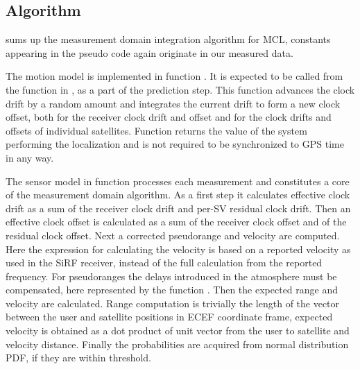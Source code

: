 \subsection{Algorithm}
 sums up the measurement domain integration
algorithm for MCL, constants appearing in the pseudo code again originate in our
measured data.

The motion model is implemented in function \predictGPS{}.
It is expected to be called from the function \sampleFromActionModel{} in ,
as a part of the prediction step.
This function advances the clock drift by a random amount
and integrates the current drift to form a new clock offset,
both for the receiver clock drift and offset and for the
clock drifts and offsets of individual satellites.
Function \timeFunc{} returns the value of the system performing the localization
and is not required to be synchronized to GPS time in any way.

The sensor model in function \observationProbabilityGPS{} processes each measurement
and constitutes a core of the measurement domain algorithm.
As a first step it calculates effective clock drift as a sum of the receiver
clock drift and per-SV residual clock drift.
Then an effective clock offset is calculated as a sum of the receiver clock offset
and of the residual clock offset.
Next a corrected pseudorange and velocity are computed.
Here the expression for calculating the velocity is based on a reported velocity
as used in the SiRF receiver, instead of the full calculation from the reported frequency.
For pseudoranges the delays introduced in the atmosphere must be compensated,
here represented by the function \delays{}.
Then the expected range and velocity are calculated.
Range computation is trivially the length of the vector between the user and 
satellite positions in ECEF coordinate frame, expected velocity is obtained
as a dot product of unit vector from the user to satellite and velocity distance.
Finally the probabilities are acquired from normal distribution PDF, if they
are within threshold.

